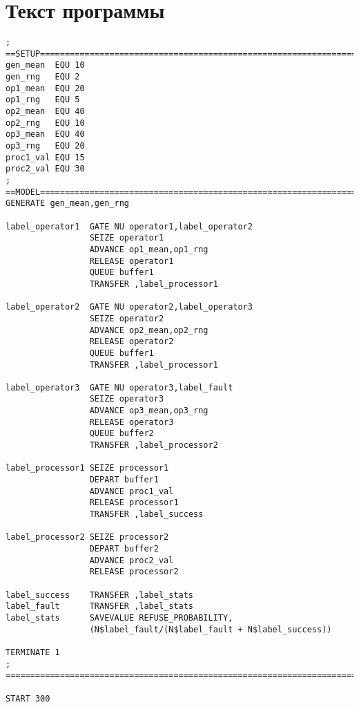 \section*{Текст программы}
\begin{lstlisting}[caption={Реализация системы}]
; ==SETUP====================================================================
gen_mean  EQU 10
gen_rng   EQU 2
op1_mean  EQU 20
op1_rng   EQU 5
op2_mean  EQU 40
op2_rng   EQU 10
op3_mean  EQU 40
op3_rng   EQU 20
proc1_val EQU 15
proc2_val EQU 30
; ==MODEL====================================================================
GENERATE gen_mean,gen_rng

label_operator1  GATE NU operator1,label_operator2
                 SEIZE operator1
                 ADVANCE op1_mean,op1_rng
                 RELEASE operator1
                 QUEUE buffer1
                 TRANSFER ,label_processor1

label_operator2  GATE NU operator2,label_operator3
                 SEIZE operator2
                 ADVANCE op2_mean,op2_rng
                 RELEASE operator2
                 QUEUE buffer1
                 TRANSFER ,label_processor1

label_operator3  GATE NU operator3,label_fault
                 SEIZE operator3
                 ADVANCE op3_mean,op3_rng
                 RELEASE operator3
                 QUEUE buffer2
                 TRANSFER ,label_processor2

label_processor1 SEIZE processor1
                 DEPART buffer1
                 ADVANCE proc1_val
                 RELEASE processor1
                 TRANSFER ,label_success

label_processor2 SEIZE processor2
                 DEPART buffer2
                 ADVANCE proc2_val
                 RELEASE processor2

label_success    TRANSFER ,label_stats
label_fault      TRANSFER ,label_stats
label_stats      SAVEVALUE REFUSE_PROBABILITY,
                 (N$label_fault/(N$label_fault + N$label_success))

TERMINATE 1
; ===========================================================================

START 300
\end{lstlisting}


